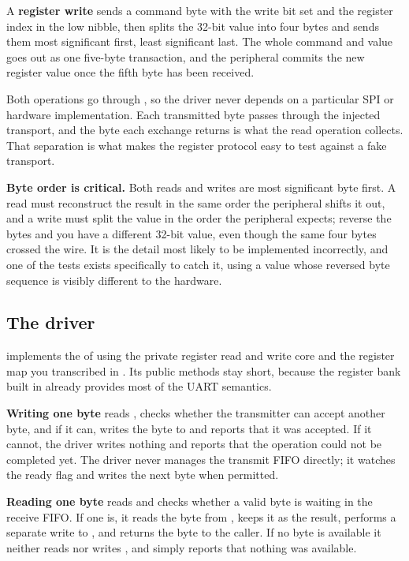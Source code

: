 A \textbf{register write} sends a command byte with the write bit set and the register index in the
low nibble, then splits the 32-bit value into four bytes and sends them most significant first,
least significant last. The whole command and value goes out as one five-byte transaction, and the
peripheral commits the new register value once the fifth byte has been received.

Both operations go through , so the driver never depends on a
particular SPI or hardware implementation. Each transmitted byte passes through the injected
transport, and the byte each exchange returns is what the read operation collects. That separation
is what makes the register protocol easy to test against a fake transport.

\textbf{Byte order is critical.} Both reads and writes are most significant byte first. A read must
reconstruct the result in the same order the peripheral shifts it out, and a write must split the
value in the order the peripheral expects; reverse the bytes and you have a different 32-bit value,
even though the same four bytes crossed the wire. It is the detail most likely to be implemented
incorrectly, and one of the tests exists specifically to catch it, using a value whose reversed byte
sequence is visibly different to the hardware.

\subsection{The driver}
\label{c7:sec:the_driver}
 implements the  of  using the private register read and write
core and the register map you transcribed in . Its public methods stay short, because the
register bank built in  already provides most of the UART semantics.

\textbf{Writing one byte} reads , checks whether the transmitter can accept another
byte, and if it can, writes the byte to  and reports that it was accepted. If it
cannot, the driver writes nothing and reports that the operation could not be completed yet. The
driver never manages the transmit FIFO directly; it watches the ready flag and writes the next byte
when permitted.

\textbf{Reading one byte} reads  and checks whether a valid byte is waiting in the
receive FIFO. If one is, it reads the byte from , keeps it as the result, performs a
separate write to , and returns the byte to the caller. If no byte is available it
neither reads  nor writes , and simply reports that nothing was
available.


